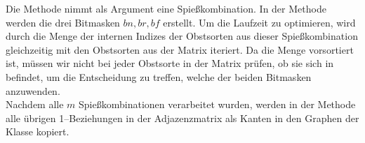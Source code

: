 Die Methode  nimmt als Argument eine Spießkombination. 
In der Methode werden die drei Bitmasken $bn, br, bf$ erstellt.
Um die Laufzeit zu optimieren, wird durch die Menge der internen Indizes der Obstsorten 
aus dieser Spießkombination gleichzeitig mit den Obstsorten aus der Matrix iteriert.
Da die Menge  vorsortiert ist, müssen wir nicht bei jeder Obstsorte in der Matrix
prüfen, ob sie sich in  befindet, um die Entscheidung zu treffen, welche der beiden
Bitmasken anzuwenden.\\
Nachdem alle $m$ Spießkombinationen verarbeitet wurden, werden in der Methode 
alle übrigen 1--Beziehungen in der Adjazenzmatrix
als Kanten in den Graphen  der Klasse  kopiert.\\


